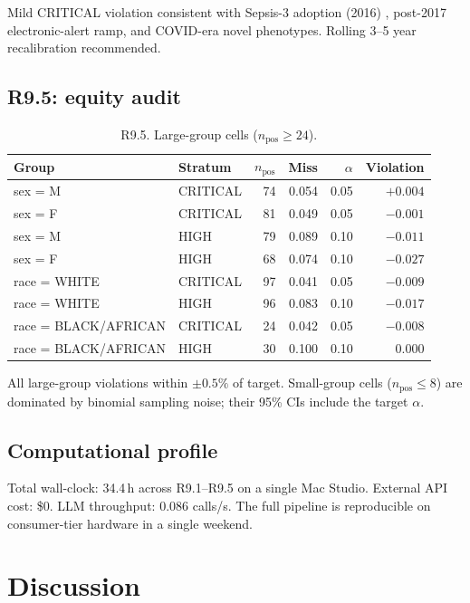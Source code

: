 \documentclass[11pt,letterpaper]{article}
\begin{document}
Mild CRITICAL violation consistent with Sepsis-3 adoption (2016)
\cite{Singer2016Sepsis3}, post-2017 electronic-alert ramp, and COVID-era
novel phenotypes. Rolling 3--5 year recalibration recommended.

\subsection{R9.5: equity audit}
\begin{table}[h!]
\centering
\caption{R9.5. Large-group cells ($n_{\text{pos}} \ge 24$).}
\begin{tabular}{llrrrr}
\toprule
Group & Stratum & $n_{\text{pos}}$ & Miss & $\alpha$ & Violation \\
\midrule
sex = M & CRITICAL & 74 & 0.054 & 0.05 & $+0.004$ \\
sex = F & CRITICAL & 81 & 0.049 & 0.05 & $-0.001$ \\
sex = M & HIGH & 79 & 0.089 & 0.10 & $-0.011$ \\
sex = F & HIGH & 68 & 0.074 & 0.10 & $-0.027$ \\
race = WHITE & CRITICAL & 97 & 0.041 & 0.05 & $-0.009$ \\
race = WHITE & HIGH & 96 & 0.083 & 0.10 & $-0.017$ \\
race = BLACK/AFRICAN & CRITICAL & 24 & 0.042 & 0.05 & $-0.008$ \\
race = BLACK/AFRICAN & HIGH & 30 & 0.100 & 0.10 & $0.000$ \\
\bottomrule
\end{tabular}
\end{table}

All large-group violations within $\pm 0.5\%$ of target. Small-group cells
($n_{\text{pos}} \le 8$) are dominated by binomial sampling noise; their
95\% CIs include the target $\alpha$.

\subsection{Computational profile}
Total wall-clock: 34.4\,h across R9.1--R9.5 on a single Mac Studio.
External API cost: \$0. LLM throughput: 0.086 calls/s. The full pipeline
is reproducible on consumer-tier hardware in a single weekend.

\section{Discussion}\label{sec:reframe}
\end{document}
